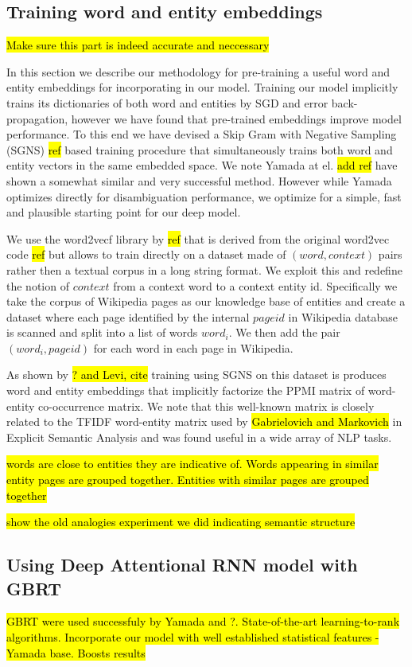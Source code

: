 \documentclass[11pt]{article}
\begin{document}
\subsection{Training word and entity embeddings}
\hl{Make sure this part is indeed accurate and neccessary}

In this section we describe our methodology for pre-training a useful word and entity embeddings for incorporating in our model. Training our model implicitly trains its dictionaries of both word and entities by SGD and error back-propagation, however we have found that pre-trained embeddings improve model performance. To this end we have devised a Skip Gram with Negative Sampling (SGNS) \hl{ref} based training procedure that simultaneously trains both word and entity vectors in the same embedded space. We note Yamada at el. \hl{add ref} have shown a somewhat similar and very successful method. However while Yamada optimizes directly for disambiguation performance, we optimize for a simple, fast and plausible starting point for our deep model.

We use the word2vecf library by \hl{ref} that is derived from the original word2vec code \hl{ref} but allows to train directly on a dataset made of $(word,context)$ pairs rather then a textual corpus in a long string format. We exploit this and redefine the notion of $context$ from a context word to a context entity id. Specifically we take the corpus of Wikipedia pages as our knowledge base of entities and create a dataset where each page identified by the internal $pageid$ in Wikipedia database is scanned and split into a list of words ${word_i}$. We then add the pair $(word_i,pageid)$ for each word in each page in Wikipedia.

As shown by \hl{? and Levi, cite} training using SGNS on this dataset is produces word and entity embeddings that implicitly factorize the PPMI matrix of word-entity co-occurrence matrix. We note that this well-known matrix is closely related to the TFIDF word-entity matrix used by \hl{Gabrielovich and Markovich} in Explicit Semantic Analysis and was found useful in a wide array of NLP tasks. 

\hl{words are close to entities they are indicative of. Words appearing in similar entity pages are grouped together. Entities with similar pages are grouped together}

\hl{show the old analogies experiment we did indicating semantic structure}

\subsection{Using Deep Attentional RNN model with GBRT}

\hl{GBRT were used successfuly by Yamada and ?. State-of-the-art learning-to-rank algorithms. Incorporate our model with well established statistical features - Yamada base. Boosts results }
\end{document}
